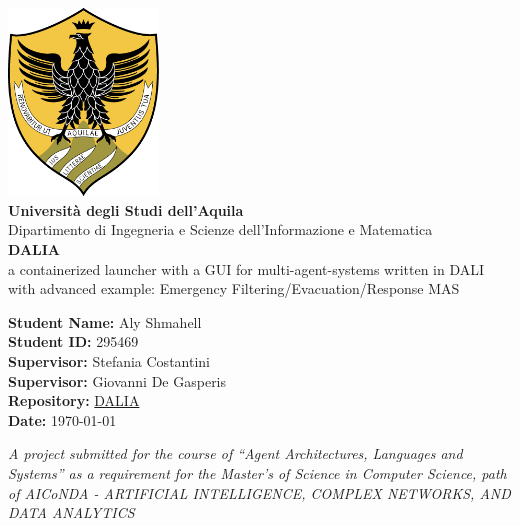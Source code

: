 \documentclass[12pt,a4paper]{article}
\begin{document}
\begin{titlepage}
    \begin{center}
        \includegraphics[width=4cm]{./UnivaqLogo.png} \\[1.5cm]
        
        {\Large \textbf{Università degli Studi dell'Aquila}} \\[0.5cm]
        
        {\large Dipartimento di Ingegneria e Scienze dell'Informazione e Matematica} \\[2cm]
        
        {\LARGE \textbf{DALIA}} \\[1.5cm]
        
        {\large a containerized launcher with a GUI for multi-agent-systems written in DALI} \\[1cm]
        {\large with advanced example: Emergency Filtering/Evacuation/Response MAS} \\[2cm]
        
        \begin{center}
            \textbf{Student Name:} Aly Shmahell \\[0.3cm]
            \textbf{Student ID:}  295469\\[0.3cm]
            \textbf{Supervisor:} Stefania Costantini \\[0.3cm]
            \textbf{Supervisor:} Giovanni De Gasperis \\[0.3cm]
            \textbf{Repository:} \href{https://github.com/AlyShmahell/dalia.git}{DALIA} \\[0.3cm]
            \textbf{Date:} \today
        \end{center}
        
        \vfill
        
        {\large \textit{A project submitted for the course of “Agent Architectures, Languages and Systems” as a requirement for the Master's of Science in Computer Science, path of AICoNDA - ARTIFICIAL INTELLIGENCE, COMPLEX NETWORKS, AND DATA ANALYTICS}}
        
    \end{center}
\end{titlepage}
\end{document}

